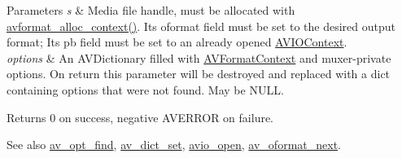 \begin{DoxyParams}{Parameters}
{\em s} & Media file handle, must be allocated with \hyperlink{group__lavf__core_gac7a91abf2f59648d995894711f070f62}{avformat\+\_\+alloc\+\_\+context()}. Its oformat field must be set to the desired output format; Its pb field must be set to an already opened \hyperlink{struct_a_v_i_o_context}{A\+V\+I\+O\+Context}. \\
\hline
{\em options} & An A\+V\+Dictionary filled with \hyperlink{struct_a_v_format_context}{A\+V\+Format\+Context} and muxer-\/private options. On return this parameter will be destroyed and replaced with a dict containing options that were not found. May be N\+U\+LL.\\
\hline
\end{DoxyParams}
\begin{DoxyReturn}{Returns}
0 on success, negative A\+V\+E\+R\+R\+OR on failure.
\end{DoxyReturn}
\begin{DoxySeeAlso}{See also}
\hyperlink{group__avoptions_gae31ae7fb20113b00108d0ecf53f25664}{av\+\_\+opt\+\_\+find}, \hyperlink{group__lavu__dict_ga8d9c2de72b310cef8e6a28c9cd3acbbe}{av\+\_\+dict\+\_\+set}, \hyperlink{avio_8h_a371a670112abc5f3e15bc570da076301}{avio\+\_\+open}, \hyperlink{group__lavf__core_ga9c169031f490901218b1e6bcd9993967}{av\+\_\+oformat\+\_\+next}. 
\end{DoxySeeAlso}
